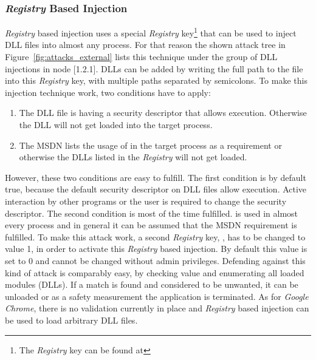\subsubsection{\emph{Registry} Based Injection}
\emph{Registry} based injection uses a special \emph{Registry} key\footnote{The \emph{Registry} key can be found at } that can be used to inject \gls{DLL} files into almost any process. For that reason the shown attack tree in Figure~\ref{fig:attacks_external} lists this technique under the group of \gls{DLL} injections in node [1.2.1]. \glspl{DLL} can be added by writing the full path to the file into this \emph{Registry} key, with multiple paths separated by semicolons. To make this injection technique work, two conditions have to apply:
\begin{enumerate}
\item The \gls{DLL} file is having a security descriptor that allows execution. Otherwise the \gls{DLL} will not get loaded into the target process.
\item The \gls{MSDN} \cite{msdn_appinitdlls} lists the usage of  in the target process as a requirement or otherwise the \glspl{DLL} listed in the \emph{Registry} will not get loaded.
\end{enumerate}
However, these two conditions are easy to fulfill. The first condition is by default true, because the default security descriptor on \gls{DLL} files allow execution. Active interaction by other programs or the user is required to change the security descriptor. The second condition is most of the time fulfilled.  is used in almost every process and in general it can be assumed that the \gls{MSDN} requirement is fulfilled. To make this attack work, a second \emph{Registry} key, , has to be changed to value 1, in order to activate this \emph{Registry} based injection. By default this value is set to 0 and cannot be changed without admin privileges.
Defending against this kind of attack is comparably easy, by checking  value and enumerating all loaded modules (\glspl{DLL}). If a match is found and considered to be unwanted, it can be unloaded or as a safety measurement the application is terminated. As for \emph{Google Chrome}, there is no validation currently in place and \emph{Registry} based injection can be used to load arbitrary \gls{DLL} files.